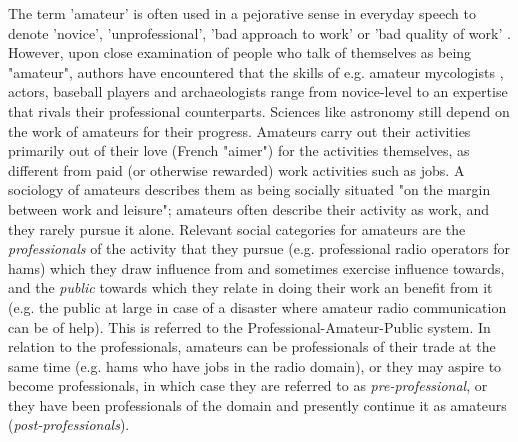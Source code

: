 \documentclass{acm_proc_article-sp}
\begin{document}
The term 'amateur' is often used in a pejorative sense in everyday speech to denote 'novice', 'unprofessional', 'bad approach to work' or 'bad quality of work' . However, upon close examination of people who talk of themselves as being "amateur", authors have encountered that the skills of e.g. amateur mycologists \cite{fine98}, actors, baseball players and archaeologists \cite{stebbins79} range from novice-level to an expertise that rivals their professional counterparts. Sciences like astronomy still depend on the work of amateurs for their progress. Amateurs carry out their activities primarily out of their love (French "aimer") for the activities themselves, as different from paid (or otherwise rewarded) work activities such as jobs. A sociology of amateurs \cite{stebbins79} describes them as being socially situated "on the margin between work and leisure"; amateurs often describe their activity as work, and they rarely pursue it alone. Relevant social categories for amateurs are the \textit{professionals} of the activity that they pursue (e.g. professional radio operators for hams) which they draw influence from and sometimes exercise influence towards, and the \textit{public} towards which they relate in doing their work an benefit from it (e.g. the public at large in case of a disaster where amateur radio communication can be of help). This is referred to the Professional-Amateur-Public system. In relation to the professionals, amateurs can be professionals of their trade at the same time (e.g. hams who have jobs in the radio domain), or they may aspire to become professionals, in which case they are referred to as \textit{pre-professional}, or they have been professionals of the domain and presently continue it as amateurs (\textit{post-professionals}).
\end{document}
